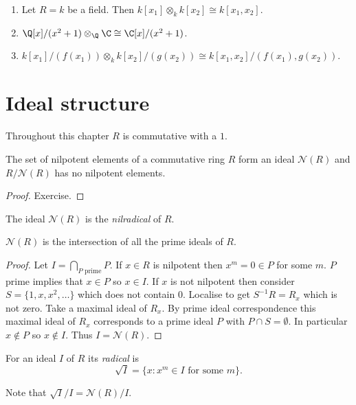 \documentclass[a4paper]{article}
\newcommand{\nilrad}[1]{\mathcal{N}({#1})} %
\begin{document}
\begin{eg}\leavevmode
  \begin{enumerate}
  \item Let \(R = k\) be a field. Then \(k[x_1] \otimes_k k[x_2] \cong k[x_1, x_2]\).
  \item \(\Q[x]/(x^2 + 1) \otimes_\Q \C \cong \C[x]/(x^2 + 1)\).
  \item \(k[x_1]/(f(x_1)) \otimes_k k[x_2]/(g(x_2)) \cong k[x_1, x_2]/(f(x_1), g(x_2))\).
  \end{enumerate}
\end{eg}

\section{Ideal structure}

Throughout this chapter \(R\) is commutative with a \(1\).

\begin{lemma}
  The set of nilpotent elements of a commutative ring \(R\) form an ideal \(\mathcal N(R)\) and \(R/\nilrad R\) has no nilpotent elements.
\end{lemma}

\begin{proof}
  Exercise.
\end{proof}

\begin{definition}[nilradical]
  The ideal \(\nilrad R\) is the \emph{nilradical} of \(R\).
\end{definition}

\begin{lemma}[Krull]
  \(\nilrad R\) is the intersection of all the prime ideals of \(R\).
\end{lemma}

\begin{proof}
  Let \(I = \bigcap_{P \text{ prime}} P\). If \(x \in R\) is nilpotent then \(x^m = 0 \in P\) for some \(m\). \(P\) prime implies that \(x \in P\) so \(x \in I\). If \(x\) is not nilpotent then consider \(S = \{1, x, x^2, \dots\}\) which does not contain \(0\). Localise to get \(S^{-1}R = R_x\) which is not zero. Take a maximal ideal of \(R_x\). By prime ideal correspondence this maximal ideal of \(R_x\) corresponds to a prime ideal \(P\) with \(P \cap S = \emptyset\). In particular \(x \notin P\) so \(x \notin I\). Thus \(I = \nilrad R\).
\end{proof}

\begin{definition}[radical]
  For an ideal \(I\) of \(R\) its \emph{radical} is
  \[
    \sqrt I = \{x: x^m \in I \text{ for some } m\}.
  \]
\end{definition}
Note that \(\sqrt I /I = \nilrad R/I\).
\end{document}
